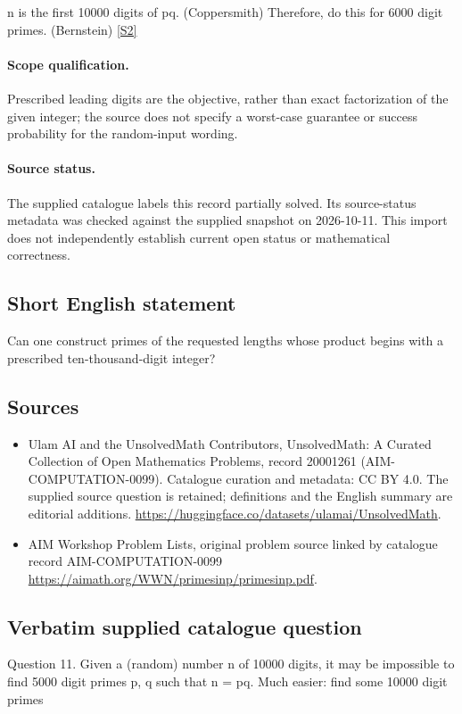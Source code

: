 \documentclass[11pt]{article}
\begin{document}
n is the first 10000 digits of pq. (Coppersmith) Therefore, do this for 6000 digit primes. (Bernstein) \href{https://aimath.org/WWN/primesinp/primesinp.pdf}{[S2]}
\paragraph{Scope qualification.}
Prescribed leading digits are the objective, rather than exact factorization of the given integer; the source does not specify a worst-case guarantee or success probability for the random-input wording.
\paragraph{Source status.}
The supplied catalogue labels this record partially solved. Its source-status metadata was checked against the supplied snapshot on 2026-10-11. This import does not independently establish current open status or mathematical correctness.
\subsection{Short English statement}
Can one construct primes of the requested lengths whose product begins with a prescribed ten-thousand-digit integer?
\subsection{Sources}
\begin{itemize}
\item[S1] Ulam AI and the UnsolvedMath Contributors, UnsolvedMath: A Curated Collection of Open Mathematics Problems, record 20001261 (AIM-COMPUTATION-0099). Catalogue curation and metadata: CC BY 4.0. The supplied source question is retained; definitions and the English summary are editorial additions.
\url{https://huggingface.co/datasets/ulamai/UnsolvedMath}.
\item[S2] AIM Workshop Problem Lists, original problem source linked by catalogue record AIM-COMPUTATION-0099
\url{https://aimath.org/WWN/primesinp/primesinp.pdf}.
\end{itemize}
\subsection{Verbatim supplied catalogue question}
Question 11. Given a (random) number n of 10000 digits, it may be impossible to find 5000 digit primes p, q such that n = pq. Much easier: find some 10000 digit primes
\end{document}
